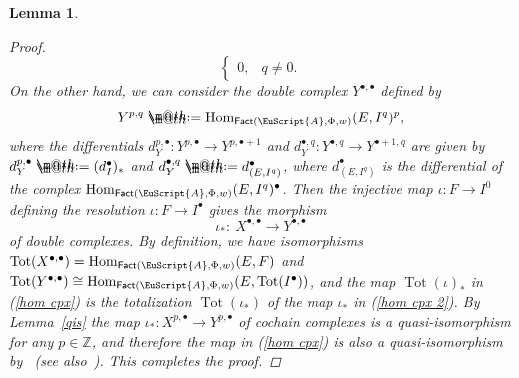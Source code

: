 \documentclass[10pt,a4paper]{amsart}
\makeatletter
\newtheorem{lem}[dfn]{Lemma}
\newcommand*{\defeq}{\mathrel{\rlap{%
 \raisebox{0.3ex}{$\m@th\cdot$}}%
 \raisebox{-0.3ex}{$\m@th\cdot$}}%
 =}
\numberwithin{equation}{section}
\newcommand{\dgFact}{\operatorname{\sf{Fact}}}
\newcommand{\Hom}{\operatorname{Hom}}
\newcommand{\Tot}{\operatorname{Tot}}
\newcommand{\bZ}{\mathbb{Z}}
\newcommand{\scrA}{\EuScript{A}}
\makeatother
\begin{document}
\begin{lem}
\begin{proof}
\begin{equation*}
\begin{cases}
0,& q\neq 0.
\end{cases}
\end{equation*}
On the other hand, we can consider the double complex $Y^{\bullet,\bullet}$ defined by
\begin{equation*}
Y^{p,q}\defeq\Hom_{\dgFact(\scrA,\Phi,w)}(E,I^q)^p,
\end{equation*}
 where the differentials $d_Y^{p,\bullet}\colon Y^{p,\bullet}\to Y^{p,\bullet+1}$ and $d_Y^{\bullet,q}\colon Y^{\bullet,q}\to Y^{\bullet+1,q}$ are given by $d_Y^{p,\bullet}\defeq (d_I^{\bullet})_*$ and $d_Y^{\bullet,q}\defeq d_{(E,I^q)}^{\bullet}$, where $d_{(E,I^q)}^{\bullet}$ is the differential of the complex $\Hom_{\dgFact(\scrA,\Phi,w)}(E,I^{q})^{\bullet}$. Then the injective map $\iota\colon F\to I^0$ defining the resolution $\iota\colon F\to I^{\bullet}$ gives the morphism
 \begin{equation}\label{hom cpx 2}
 \iota_*\colon\ X^{\bullet,\bullet}\to Y^{\bullet,\bullet}
 \end{equation}
 of double complexes. By definition, we have isomorphisms $\Tot(X^{\bullet,\bullet})=\Hom_{\dgFact(\scrA,\Phi,w)}(E,F)$ and $\Tot(Y^{\bullet,\bullet})\cong\Hom_{\dgFact(\scrA,\Phi,w)}(E,\Tot(I^{\bullet}))$, and the map $\Tot(\iota)_*$ in (\ref{hom cpx}) is the totalization $\Tot(\iota_*)$ of the map $\iota_*$ in (\ref{hom cpx 2}).
By Lemma~\ref{qis} the map $\iota_*\colon X^{p,\bullet}\to Y^{p,\bullet}$ of cochain complexes is a quasi-isomorphism for any $p\in \bZ$, and therefore the map in (\ref{hom cpx}) is also a quasi-isomorphism by~\cite[Theorem~1.9.3]{ks} (see also~\cite[Lemma~2.46]{ls}). This completes the proof.
\end{proof}
\end{lem}
\end{document}
